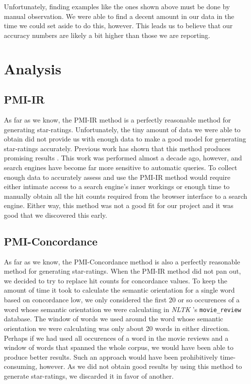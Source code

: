 \documentclass[11pt]{report} %
\begin{document}
Unfortunately, finding examples like the ones shown above must be done by manual observation. We were able to find a decent amount in our data in the time we could set aside to do this, however. This leads us to believe that our accuracy numbers are likely a bit higher than those we are reporting.


\chapter{Analysis}
	\section{PMI-IR}

As far as we know, the PMI-IR method is a perfectly reasonable method for generating star-ratings. Unfortunately, the tiny amount of data we were able to obtain did not provide us with enough data to make a good model for generating star-ratings accurately. Previous work has shown that this method produces promising results \cite{Turney2001}. This work was performed almost a decade ago, however, and search engines have become far more sensitive to automatic queries. To collect enough data to accurately assess and use the PMI-IR method would require either intimate access to a search engine's inner workings or enough time to manually obtain all the hit counts required from the browser interface to a search engine. Either way, this method was not a good fit for our project and it was good that we discovered this early.

	\section{PMI-Concordance}

As far as we know, the PMI-Concordance method is also a perfectly reasonable method for generating star-ratings. When the PMI-IR method did not pan out, we decided to try to replace hit counts for concordance values. To keep the amount of time it took to calculate the semantic orientation for a single word based on concordance low, we only considered the first 20 or so occurences of a word whose semantic orientation we were calculating in \textit{NLTK} 's \verb|movie_review| database. The window of words we used around the word whose semantic orientation we were calculating was only about 20 words in either direction. Perhaps if we had used all occurences of a word in the movie reviews and a window of words that spanned the whole corpus, we would have been able to produce better results. Such an approach would have been prohibitively time-consuming, however. As we did not obtain good results by using this method to generate star-ratings, we discarded it in favor of another. 
\end{document}
